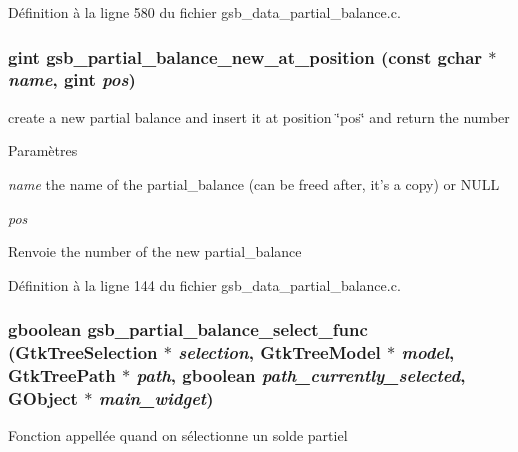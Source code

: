 Définition à la ligne 580 du fichier gsb\_\-data\_\-partial\_\-balance.c.

\subsubsection[{gsb\_\-partial\_\-balance\_\-new\_\-at\_\-position}]{\setlength{\rightskip}{0pt plus 5cm}gint gsb\_\-partial\_\-balance\_\-new\_\-at\_\-position (const gchar $\ast$ {\em name}, \/  gint {\em pos})}\label{gsb__data__partial__balance_8c_a6b7468f19714666d0e109e82c1e2250a}
create a new partial balance and insert it at position \char`\"{}pos\char`\"{} and return the number


\begin{DoxyParams}{Paramètres}
\item[{\em name}]the name of the partial\_\-balance (can be freed after, it's a copy) or NULL \item[{\em pos}]\end{DoxyParams}
\begin{DoxyReturn}{Renvoie}
the number of the new partial\_\-balance 
\end{DoxyReturn}


Définition à la ligne 144 du fichier gsb\_\-data\_\-partial\_\-balance.c.

\subsubsection[{gsb\_\-partial\_\-balance\_\-select\_\-func}]{\setlength{\rightskip}{0pt plus 5cm}gboolean gsb\_\-partial\_\-balance\_\-select\_\-func (GtkTreeSelection $\ast$ {\em selection}, \/  GtkTreeModel $\ast$ {\em model}, \/  GtkTreePath $\ast$ {\em path}, \/  gboolean {\em path\_\-currently\_\-selected}, \/  GObject $\ast$ {\em main\_\-widget})}\label{gsb__data__partial__balance_8c_a41445613bc74e7cec65115a097e486fa}
Fonction appellée quand on sélectionne un solde partiel 

